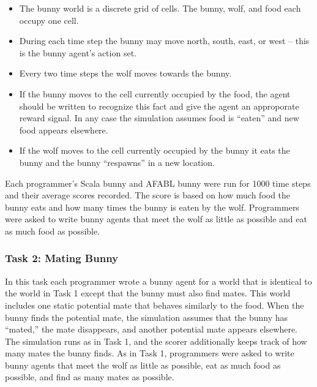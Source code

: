 \begin{itemize}

\item The bunny world is a discrete grid of cells.  The bunny, wolf, and food each occupy one cell.

\item During each time step the bunny may move north, south, east, or west -- this is the bunny agent's action set.

\item Every two time steps the wolf moves towards the bunny.

\item If the bunny moves to the cell currently occupied by the food, the agent should be written to recognize this fact and give the agent an approporate reward signal. In any case the simulation assumes food is ``eaten'' and new food appears elsewhere.

\item If the wolf moves to the cell currently occupied by the bunny it eats the bunny and the bunny ``respawns'' in a new location.

\end{itemize}

Each programmer's Scala bunny and AFABL bunny were run for 1000 time steps and their average scores recorded. The score is based on how much food the bunny eats and how many times the bunny is eaten by the wolf.  Programmers were asked to write bunny agents that meet the wolf as little as possible and eat as much food as possible.

\subsubsection{Task 2: Mating Bunny}\label{sec:task2}

In this task each programmer wrote a bunny agent for a world that is identical to the world in Task 1 except that the bunny must also find mates.  This world includes one static  potential mate that behaves similarly to the food.  When the bunny finds the potential mate, the simulation assumes that the bunny has ``mated,'' the mate disappears, and another potential mate appears elsewhere.  The simulation runs as in Task 1, and the scorer additionally keeps track of how many mates the bunny finds.  As in Task 1, programmers were asked to write bunny agents that meet the wolf as little as possible, eat as much food as possible, and find as many mates as possible.

